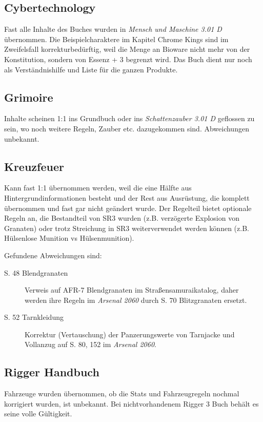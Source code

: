 \documentclass[a4paper]{scrartcl}
\begin{document}
\subsection{Cybertechnology}
Fast alle Inhalte des Buches wurden in \textit{Mensch und Maschine 3.01 D} übernommen. Die Beispielcharaktere im Kapitel Chrome Kings sind im Zweifelsfall korrekturbedürftig, weil die Menge an Bioware nicht mehr von der Konstitution, sondern von Essenz + 3 begrenzt wird. Das Buch dient nur noch als Verständnishilfe und Liste für die ganzen Produkte.

\subsection{Grimoire}
Inhalte scheinen 1:1 ins Grundbuch oder ins \textit{Schattenzauber 3.01 D} geflossen zu sein, wo noch weitere Regeln, Zauber etc. dazugekommen sind. Abweichungen unbekannt.

\subsection{Kreuzfeuer}
Kann fast 1:1 übernommen werden, weil die eine Hälfte aus Hintergrundinformationen besteht und der Rest aus Ausrüstung, die komplett übernommen und fast gar nicht geändert wurde. Der Regelteil bietet optionale Regeln an, die Bestandteil von SR3 wurden (z.B. verzögerte Explosion von Granaten) oder trotz Streichung in SR3 weiterverwendet werden können (z.B. Hülsenlose Munition vs Hülsenmunition).

Gefundene Abweichungen sind:
\begin{description}
 \item[S. 48 Blendgranaten] Verweis auf AFR-7 Blendgranaten im Straßensamuraikatalog, daher werden ihre Regeln im \textit{Arsenal 2060} durch S. 70 Blitzgranaten ersetzt.
 \item[S. 52 Tarnkleidung] Korrektur (Vertauschung) der Panzerungswerte von Tarnjacke und Vollanzug auf S. 80, 152 im \textit{Arsenal 2060}.
\end{description}

\subsection{Rigger Handbuch}
Fahrzeuge wurden übernommen, ob die Stats und Fahrzeugregeln nochmal korrigiert wurden, ist unbekannt. Bei nichtvorhandenem Rigger 3 Buch behält es seine volle Gültigkeit.
\end{document}
